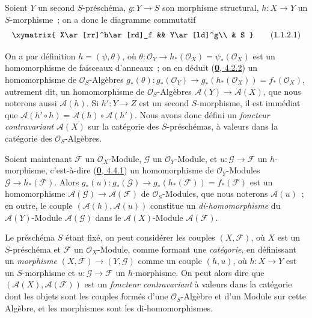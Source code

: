 \begin{env}[1.1.2]
\label{II.1.1.2-fr}
Soient $Y$ un second $S$-préschéma, $g:Y\to S$ son morphisme structural,
$h:X\to Y$ un $S$-morphisme~; on a donc le diagramme commutatif
\[
  \xymatrix{
    X\ar[rr]^h\ar[rd]_f && Y\ar[ld]^g\\
    & S
  }
  \tag{1.1.2.1}\label{II.1.1.2.1-fr}
\]

On a par définition $h=(\psi,\theta)$, où
$\theta:\mathcal{O}_Y\to h_*(\mathcal{O}_X)=\psi_*(\mathcal{O}_X)$ est un
homomorphisme de faisceaux d'anneaux~; on en déduit
(\hyperref[0.4.2.2-fr]{\textbf{0}, 4.2.2}) un homomorphisme de
$\mathcal{O}_S$-Algèbres
$g_*(\theta):g_*(\mathcal{O}_Y)\to g_*(h_*(\mathcal{O}_X))=f_*(\mathcal{O}_X)$,
autrement dit, un homomorphisme de $\mathcal{O}_S$-Algèbres
$\mathcal{A}(Y)\to\mathcal{A}(X)$, que nous noterons aussi
$\mathcal{A}(h)$. Si $h':Y\to Z$ est un second $S$-morphisme, il est immédiat
que $\mathcal{A}(h'\circ h)=\mathcal{A}(h)\circ\mathcal{A}(h')$. Nous avons
donc défini un \emph{foncteur contravariant} $\mathcal{A}(X)$ sur la catégorie
des $S$-préschémas, à valeurs dans la catégorie des
$\mathcal{O}_S$-Algèbres.

Soient maintenant $\mathcal{F}$ un $\mathcal{O}_X$-Module, $\mathcal{G}$ un
$\mathcal{O}_Y$-Module, et $u:\mathcal{G}\to\mathcal{F}$ un $h$-morphisme,
c'est-à-dire (\hyperref[0.4.4.1-fr]{\textbf{0}, 4.4.1}) un homomorphisme de
$\mathcal{O}_Y$-Modules $\mathcal{G}\to h_*(\mathcal{F})$. Alors
$g_*(u):g_*(\mathcal{G})\to g_*(h_*(\mathcal{F}))=f_*(\mathcal{F})$
est un homomorphisme $\mathcal{A}(\mathcal{G})\to
\mathcal{A}(\mathcal{F})$ de $\mathcal{O}_S$-Modules, que nous noterons
$\mathcal{A}(u)$~; en outre, le couple
$(\mathcal{A}(h),\mathcal{A}(u))$ constitue un \emph{di-homomorphisme} du
$\mathcal{A}(Y)$-Module $\mathcal{A}(\mathcal{G})$ dans le
$\mathcal{A}(X)$-Module $\mathcal{A}(\mathcal{F})$.
\end{env}

\begin{env}[1.1.3]
\label{II.1.1.3-fr}
Le préschéma $S$ étant fixé, on peut considérer les couples
$(X,\mathcal{F})$, où $X$ est un $S$-préschéma et $\mathcal{F}$ un
$\mathcal{O}_X$-Module, comme formant une \emph{catégorie}, en définissant un
\emph{morphisme} $(X,\mathcal{F})\to(Y,\mathcal{G})$ comme un couple $(h,u)$,
où $h:X\to Y$ est un $S$-morphisme et $u:\mathcal{G}\to\mathcal{F}$ un
$h$-morphisme. On peut alors dire que
$(\mathcal{A}(X),\mathcal{A}(\mathcal{F}))$ est un \emph{foncteur
contravariant} à valeurs dans la catégorie dont les objets sont les couples
formés d'une $\mathcal{O}_S$-Algèbre et d'un Module sur cette Algèbre, et les
morphismes sont les di-homomorphismes.
\end{env}

